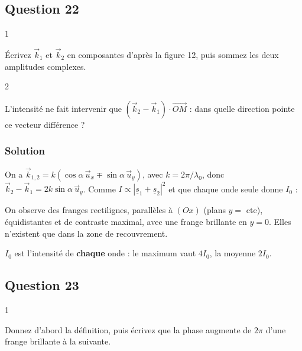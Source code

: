 \documentclass[11pt,a4paper]{article}
\newcommand{\equationajustee}[1]{%
  \sbox{\boiteequation}{$\displaystyle #1$}%
  \ifdim\wd\boiteequation>\linewidth
    \[\resizebox{\linewidth}{!}{\usebox{\boiteequation}}\]%
  \else
    \[#1\]%
  \fi}
\begin{document}
\hypertarget{question-22}{%
\subsection{Question 22}\label{question-22}}

\begin{indication}{1}

Écrivez \(\vec k_1\) et \(\vec k_2\) en composantes d'après la figure 12, puis sommez les deux amplitudes complexes.

\end{indication}

\begin{indication}{2}

L'intensité ne fait intervenir que \((\vec k_2 - \vec k_1)\cdot\overrightarrow{OM}\) : dans quelle direction pointe ce vecteur différence ?

\end{indication}

\hypertarget{solution-21}{%
\subsubsection{Solution}\label{solution-21}}

On a \(\vec k_{1,2} = k(\cos\alpha\,\vec u_x \mp \sin\alpha\,\vec u_y)\), avec \(k = 2\pi/\lambda_0\), donc \(\vec k_2 - \vec k_1 = 2k\sin\alpha\,\vec u_y\). Comme \(I \propto |\underline s_1 + \underline s_2|^2\) et que chaque onde seule donne \(I_0\) :

\equationajustee{\boxed{I = 2I_0\left[1 + \cos\left(\frac{4\pi\sin\alpha}{\lambda_0}\,y\right)\right]}}

On observe des franges rectilignes, parallèles à \((Ox)\) (plans \(y =\) cte), équidistantes et de contraste maximal, avec une frange brillante en \(y = 0\). Elles n'existent que dans la zone de recouvrement.

\begin{piege}

\(I_0\) est l'intensité de \textbf{chaque} onde : le maximum vaut \(4I_0\), la moyenne \(2I_0\).

\end{piege}

\hypertarget{question-23}{%
\subsection{Question 23}\label{question-23}}

\begin{indication}{1}

Donnez d'abord la définition, puis écrivez que la phase augmente de \(2\pi\) d'une frange brillante à la suivante.

\end{indication}
\end{document}
